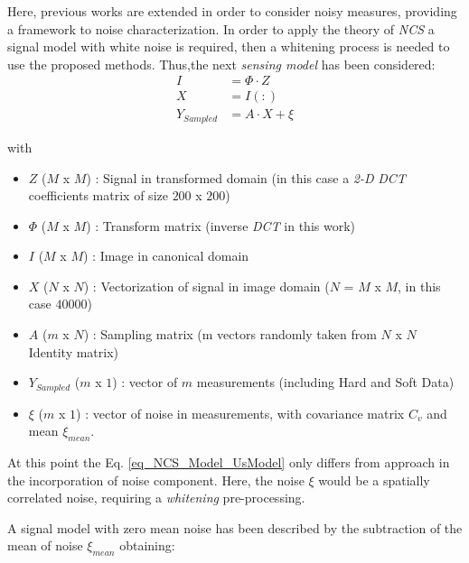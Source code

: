 Here, previous works are extended in order to consider noisy measures, providing a framework to noise characterization. In order to apply the theory of \emph{NCS} a signal model with white noise is required, then a whitening process is needed to use the proposed methods. Thus,the next \emph{sensing model} has been considered: \\

\begin{align}
	 I & = \Phi \cdot Z     \\ 
	 X & = I(:)             \\
	 Y_{Sampled} & = A \cdot X + \xi 
\label{eq_NCS_Model_UsModel}
\end{align}


{with}

			\begin{itemize}
					\item $Z$    ($M$ x $M$)   : Signal in transformed domain (in this case a \emph{2-D} \emph{DCT} coefficients matrix of size $200$ x $200$)
					\item $\Phi$ ($M$ x $M$)   : Transform matrix (inverse \emph{DCT} in this work)

					\item $I$    ($M$ x $M$)   : Image in canonical domain
					\item $X$    ($N$ x $N$)   : Vectorization of signal in image domain ($N$ = $M$ x $M$, in this case $40000$)
					
					\item $A$    ($m$ x $N$) : Sampling matrix (m vectors randomly taken from $N$ x $N$ Identity matrix) 										
															
					\item $Y_{Sampled}$    ($m$ x $1$)   : vector of $m$ measurements (including Hard and Soft Data) 
					\item $\xi$  ($m$ x $1$)   : vector of noise in measurements, with covariance matrix $C_v$ and mean $\xi_{mean}$.
			\end{itemize}
	
At this point the Eq. \eqref{eq_NCS_Model_UsModel} only differs from \cite{Calderon2015_a} approach in the incorporation of noise component. Here, the noise $\xi$ would be a spatially correlated noise, requiring a \emph{whitening} pre-processing.

	
A signal model with zero mean noise has been described by the subtraction of the mean of noise $\xi_{mean}$ obtaining: \\
	
